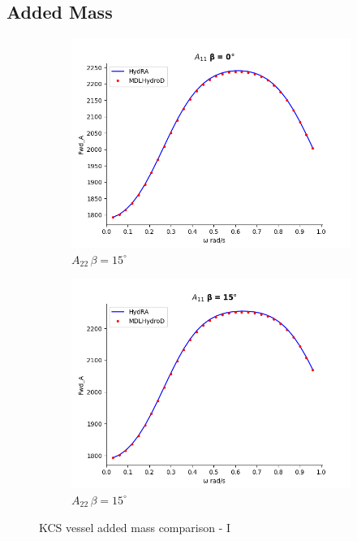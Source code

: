 \subsection{Added Mass}
\begin{figure}[!ht]
    \centering
    \begin{subfigure}[b]{0.45\textwidth}
        \includegraphics[width=\textwidth]{plots/kcs/added_mass/A11_BETA_0.png}
        \caption{$A_{22} \, \beta = 15^{\circ}$}
    \end{subfigure}
    \begin{subfigure}[b]{0.45\textwidth}
        \includegraphics[width=\textwidth]{plots/kcs/added_mass/A11_BETA_15.png}
        \caption{$A_{22} \, \beta = 15^{\circ}$}
    \end{subfigure}
    \caption{KCS vessel added mass comparison - I}
    \label{fig:kcs_addedmass_1}
\end{figure}
